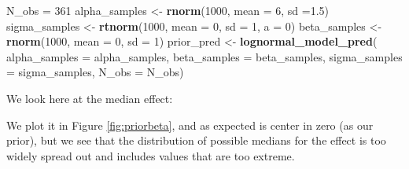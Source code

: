 \documentclass[12pt,]{krantz}
\newenvironment{Shaded}{\begin{snugshade}}{\end{snugshade}}
\newcommand{\KeywordTok}[1]{\textcolor[rgb]{0.13,0.29,0.53}{\textbf{#1}}}
\newcommand{\DataTypeTok}[1]{\textcolor[rgb]{0.13,0.29,0.53}{#1}}
\newcommand{\DecValTok}[1]{\textcolor[rgb]{0.00,0.00,0.81}{#1}}
\newcommand{\FloatTok}[1]{\textcolor[rgb]{0.00,0.00,0.81}{#1}}
\newcommand{\StringTok}[1]{\textcolor[rgb]{0.31,0.60,0.02}{#1}}
\newcommand{\OtherTok}[1]{\textcolor[rgb]{0.56,0.35,0.01}{#1}}
\newcommand{\OperatorTok}[1]{\textcolor[rgb]{0.81,0.36,0.00}{\textbf{#1}}}
\newcommand{\NormalTok}[1]{#1}
\theoremstyle{definition}
\theoremstyle{definition}
\theoremstyle{definition}
\theoremstyle{remark}
\begin{document}
\begin{Shaded}
\begin{Highlighting}[]
\NormalTok{N_obs =}\StringTok{ }\DecValTok{361}
\NormalTok{alpha_samples <-}\StringTok{ }\KeywordTok{rnorm}\NormalTok{(}\DecValTok{1000}\NormalTok{, }\DataTypeTok{mean =} \DecValTok{6}\NormalTok{, }\DataTypeTok{sd =}\FloatTok{1.5}\NormalTok{)}
\NormalTok{sigma_samples <-}\StringTok{ }\KeywordTok{rtnorm}\NormalTok{(}\DecValTok{1000}\NormalTok{, }\DataTypeTok{mean =} \DecValTok{0}\NormalTok{, }\DataTypeTok{sd =} \DecValTok{1}\NormalTok{, }\DataTypeTok{a =} \DecValTok{0}\NormalTok{)}
\NormalTok{beta_samples <-}\StringTok{ }\KeywordTok{rnorm}\NormalTok{(}\DecValTok{1000}\NormalTok{, }\DataTypeTok{mean =} \DecValTok{0}\NormalTok{, }\DataTypeTok{sd =} \DecValTok{1}\NormalTok{)}
\NormalTok{prior_pred <-}\StringTok{ }\KeywordTok{lognormal_model_pred}\NormalTok{(}
    \DataTypeTok{alpha_samples =}\NormalTok{ alpha_samples,}
    \DataTypeTok{beta_samples =}\NormalTok{ beta_samples, }
    \DataTypeTok{sigma_samples =}\NormalTok{ sigma_samples,}
    \DataTypeTok{N_obs =}\NormalTok{ N_obs)}
\end{Highlighting}
\end{Shaded}

We look here at the median effect:

\begin{Shaded}
\end{Shaded}

We plot it in Figure \ref{fig:priorbeta}, and as expected is center in
zero (as our prior), but we see that the distribution of possible
medians for the effect is too widely spread out and includes values that
are too extreme.




\begin{Shaded}
\end{Shaded}
\end{document}

